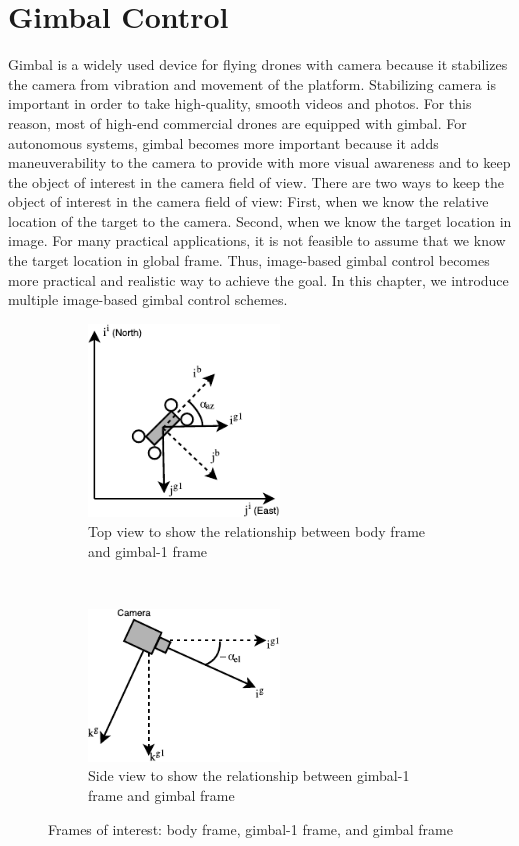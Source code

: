 \chapter{Gimbal Control}
\label{chp:chapter2}
\graphicspath{{figures/}{figures/chapter2/}}
Gimbal is a widely used device for flying drones with camera because it stabilizes the camera from vibration and movement of the platform. Stabilizing camera is important in order to take high-quality, smooth videos and photos. For this reason, most of high-end commercial drones are equipped with gimbal. For autonomous systems, gimbal becomes more important because it adds maneuverability to the camera to provide with more visual awareness and to keep the object of interest in the camera field of view. There are two ways to keep the object of interest in the camera field of view: First, when we know the relative location of the target to the camera. Second, when we know the target location in image. For many practical applications, it is not feasible to assume that we know the target location in global frame. Thus, image-based gimbal control becomes more practical and realistic way to achieve the goal. In this chapter, we introduce multiple image-based gimbal control schemes.

\begin{figure}[t]
    \centering
    \begin{subfigure}[t]{0.5\textwidth}
    	\centering
    	\includegraphics[width=2in]{images/chapter2/gimbal1_frame}
    	\caption{Top view to show the relationship between body frame and gimbal-1 frame}
    \end{subfigure}%
    ~ 
    \begin{subfigure}[t]{0.5\textwidth}
    	\centering
    	\includegraphics[width=2in]{images/chapter2/gimbal_frame}
    	\caption{Side view to show the relationship between gimbal-1 frame and gimbal frame}
    \end{subfigure}
    \caption{Frames of interest: body frame, gimbal-1 frame, and gimbal frame}
    \label{gimbal_frame}
\end{figure}

